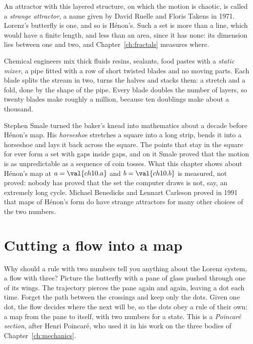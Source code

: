 \noindent
An attractor with this layered structure, on which the motion is chaotic, is
called a \emph{strange attractor}, a name given by David Ruelle and Floris
Takens in 1971. Lorenz's butterfly is one, and so is Hénon's. Such a set is
more than a line, which would have a finite length, and less than an area,
since it has none: its dimension lies between one and two, and
Chapter~\ref{ch:fractals} measures where.

\begin{worldbox}
Chemical engineers mix thick fluids \dash{} resins, sealants, food pastes
\dash{} with a \emph{static mixer}, a pipe fitted with a row of short twisted
blades and no moving parts. Each blade splits the stream in two, turns the
halves and stacks them: a stretch and a fold, done by the shape of the pipe.
Every blade doubles the number of layers, so twenty blades make roughly a
million, because ten doublings make about a thousand.
\end{worldbox}

\begin{rigourbox}
Stephen Smale turned the baker's knead into mathematics about a decade
before Hénon's map. His
\emph{horseshoe} stretches a square into a long strip, bends it into a
horseshoe and lays it back across the square. The points that stay in the
square for ever form a set with gaps inside gaps, and on it Smale proved that
the motion is as unpredictable as a sequence of coin tosses. What this chapter
shows about Hénon's map at $a = \val{ch10.a}$ and $b = \val{ch10.b}$ is
measured, not proved: nobody has proved that the set the computer draws is not,
say, an extremely long cycle. Michael Benedicks and Lennart Carleson proved in
1991 that maps of Hénon's form do have strange attractors for many other
choices of the two numbers.
\end{rigourbox}

\section{Cutting a flow into a map}
\label{sec:ch10-section}

\noindent
Why should a rule with two numbers tell you anything about the Lorenz system,
a flow with three? Picture the butterfly with a pane of glass pushed through
one of its wings. The trajectory pierces the pane again and again, leaving a
dot each time. Forget the path between the crossings and keep only the dots.
Given one dot, the flow decides where the next will be, so the dots obey a
rule of their own: a map from the pane to itself, with two numbers for a
state. This is a \emph{Poincaré section}, after Henri Poincaré, who used it in
his work on the three bodies of Chapter~\ref{ch:mechanics}.

